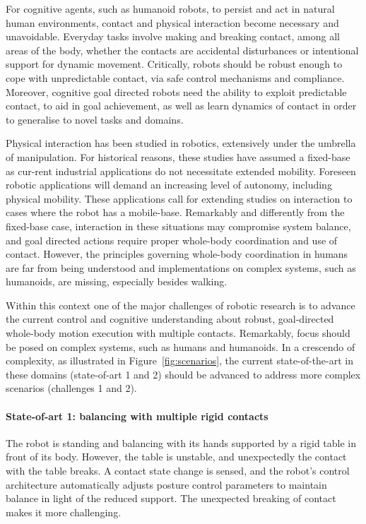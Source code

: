 \documentclass[final,5p,twocolumn]{elsarticle}
\begin{document}
For cognitive agents, such as humanoid robots, to persist and act in natural human environments, contact and physical interaction become necessary and unavoidable. Everyday tasks involve making and breaking contact, among all areas of the body, whether the contacts are accidental disturbances or intentional support for dynamic movement. Critically, robots should be robust enough to cope with unpredictable contact, via safe control mechanisms and compliance.  Moreover, cognitive goal directed robots need the ability to exploit predictable contact, to aid in goal achievement, as well as learn dynamics of contact in order to generalise to novel tasks and domains.

Physical interaction has been studied in robotics, extensively under the umbrella of manipulation. For historical reasons, these studies have assumed a fixed-base as cur-rent industrial applications do not necessitate extended mobility. Foreseen robotic applications will demand an increasing level of autonomy, including physical mobility. These applications call for extending studies on interaction to cases where the robot has a mobile-base. Remarkably and differently from the fixed-base case, interaction in these situations may compromise system balance, and goal directed actions require proper whole-body coordination and use of contact. However, the principles governing whole-body coordination in humans are far from being understood and implementations on complex systems, such as humanoids, are missing, especially besides walking.

Within this context one of the major challenges of robotic research is to advance the current control and cognitive understanding about robust, goal-directed whole-body motion execution with multiple contacts. Remarkably, focus should be posed on complex systems, such as humans and humanoids. In a crescendo of complexity, as illustrated in Figure~\ref{fig:scenarios}, the current state-of-the-art in these domains (state-of-art 1 and 2) should be advanced to address more complex scenarios (challenges 1 and 2).

\paragraph{State-of-art 1: balancing with multiple rigid contacts} The robot is standing and balancing with its hands supported by a rigid table in front of its body. However, the table is unstable, and unexpectedly the contact with the table breaks. A contact state change is sensed, and the robot's control architecture automatically adjusts posture control parameters to maintain balance in light of the reduced support. The unexpected breaking of contact makes it more challenging.
\end{document}
